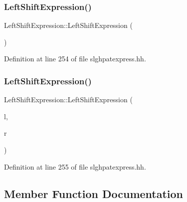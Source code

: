 \subsubsection{\texorpdfstring{LeftShiftExpression()}{LeftShiftExpression()}\hspace{0.1cm}{\footnotesize\ttfamily [1/2]}}
{\footnotesize\ttfamily Left\+Shift\+Expression\+::\+Left\+Shift\+Expression (\begin{DoxyParamCaption}\item[{void}]{ }\end{DoxyParamCaption})\hspace{0.3cm}{\ttfamily [inline]}}



Definition at line 254 of file slghpatexpress.\+hh.

\mbox{\label{class_left_shift_expression_a6526f7824e9f0f1acc56f80d417c7336}} 
\subsubsection{\texorpdfstring{LeftShiftExpression()}{LeftShiftExpression()}\hspace{0.1cm}{\footnotesize\ttfamily [2/2]}}
{\footnotesize\ttfamily Left\+Shift\+Expression\+::\+Left\+Shift\+Expression (\begin{DoxyParamCaption}\item[{\mbox{\hyperlink{class_pattern_expression}{Pattern\+Expression}} $\ast$}]{l,  }\item[{\mbox{\hyperlink{class_pattern_expression}{Pattern\+Expression}} $\ast$}]{r }\end{DoxyParamCaption})\hspace{0.3cm}{\ttfamily [inline]}}



Definition at line 255 of file slghpatexpress.\+hh.



\subsection{Member Function Documentation}
\mbox{\label{class_left_shift_expression_a7c77ac72cf7367db152a535bb07bb2dd}} 
